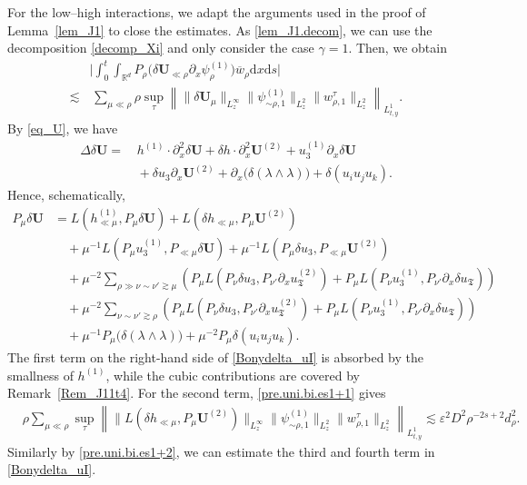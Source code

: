 \documentclass[11pt,letterpaper,reqno]{amsart}
\numberwithin{equation}{section}
\theoremstyle{definition}
\theoremstyle{remark}
\begin{document}
For the low--high interactions, we adapt the arguments used in the proof of Lemma~\ref{lem_J1} to close the estimates.  As \eqref{lem_J1.decom}, we can use the decomposition \eqref{decomp_Xi} and only consider the case \(\gamma=1\). Then, we obtain
 \begin{align}
  & \Big |
\int_0^t\int_{\mathbb R^d}
P_\rho
\big(
\delta \mathbf{U} _{\ll\rho}
\partial_x\psi^{(1)}_\rho
\big)
\overline{w}_\rho
\mathrm{d} x \mathrm{d} s 
\Big |   \nonumber\\
\lesssim &\,
\sum_{\mu\ll\rho}
\rho
\sup_\tau
\left\|
\| \delta\mathbf{U} _{\mu}\|_{L^\infty_z}
\|\psi^{(1)}_{\sim\rho,1}\|_{L^2_z}
\|w_{\rho,1}^{\tau}\|_{L^2_z}
\right\|_{L^1_{t,y}}. \label{deltU.lh}
 \end{align}
By \eqref{eq_U}, 
we have
\begin{align*}
    \Delta\delta \mathbf{U}
= &\,
h^{(1)} \cdot\partial_x^2\delta \mathbf{U}
+
\delta h \cdot \partial_x^2 \mathbf{U}^{(2)}
+
u_3^{(1)}\partial_x\delta\mathbf{U}\\
&\,+
\delta u_3\partial_x \mathbf{U}^{(2)}
+
\partial_x\big( \delta (\lambda\wedge\lambda)\big)
+
\delta(u_i u_j u_k).
\end{align*}
Hence, schematically,
\begin{align}
P_\mu\delta \mathbf{U}
&=
L(h^{(1)}_{\ll\mu},P_\mu\delta \mathbf{U})
+
L(\delta h_{\ll\mu},P_\mu \mathbf{U}^{(2)}) \nonumber
\\
&\quad
+
\mu^{-1}L(P_\mu u_3^{(1)},P_{\ll\mu}\delta \mathbf{U})+
\mu^{-1}L(P_\mu\delta u_3,P_{\ll\mu}\mathbf{U}^{(2)})
\label{Bonydelta_uI}\\
&\quad
+
\mu^{-2}
\sum_{ \rho \gg \nu\sim\nu'\gtrsim\mu} (
P_\mu L(P_\nu\delta u_3,P_{\nu'}\partial_xu_{\mathfrak T}^{(2)})+P_\mu L(P_\nu u_3^{(1)},P_{\nu'}\partial_x\delta u_{\mathfrak T})) \nonumber
\\
&\quad
+
 \mu^{-2}
\sum_{\nu\sim\nu'\gtrsim\rho} (
P_\mu L(P_\nu\delta u_3,P_{\nu'}\partial_xu_{\mathfrak T}^{(2)})+P_\mu L(P_\nu u_3^{(1)},P_{\nu'}\partial_x\delta u_{\mathfrak T})) 
\nonumber\\
&\quad
+
\mu^{-1}P_\mu\big(  \delta(\lambda\wedge\lambda)\big)
+
\mu^{-2}P_\mu\delta(u_i u_j u_k). \nonumber
\end{align}
The first term on the right-hand side of \eqref{Bonydelta_uI} is absorbed
by the smallness of \(h^{(1)}\), while the cubic contributions are covered
by Remark~\ref{Rem_J11t4}. For the second term,
\eqref{pre.uni.bi.es1+1} gives
 \begin{align*}
& \rho \sum_{\mu\ll\rho}\sup_\tau\left\|\|L(\delta h_{\ll\mu},P_\mu \mathbf{U}^{(2)}) \|_{L^\infty_z}\|\psi_{\sim\rho,1}^{(1)}\|_{L^2_z}
\|w_{\rho,1}^{\tau}\|_{L^2_z}\right\|_{L^1_{t,y}} 
\lesssim   \varepsilon^2 D^2  \rho^{-2s+2} d_\rho^2.
\end{align*}
 Similarly by \eqref{pre.uni.bi.es1+2}, we can estimate  the  third and fourth  term in \eqref{Bonydelta_uI}. 
\end{document}
